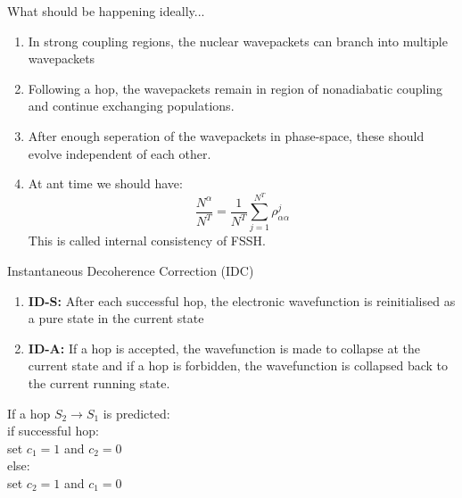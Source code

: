 \documentclass{beamer}
\begin{document}
	\begin{frame}[t]{What should be happening ideally...}
	\begin{enumerate}
	\item{In strong coupling regions, the nuclear wavepackets can branch into multiple wavepackets}
	\item{Following a hop, the wavepackets remain in region of nonadiabatic coupling and continue exchanging populations.}
	\item{After enough seperation of the wavepackets in phase-space, these should evolve independent of each other.}
	\item{At ant time we should have:
	\begin{equation}\label{eq:15}
	\frac{N^\alpha}{N^T} = \frac{1}{N^T}\sum_{j=1}^{N^T} \rho_{\alpha\alpha}^j
	\end{equation}
	This is called internal consistency of FSSH.}
	\end{enumerate}
	\end{frame}
	

	
	\begin{frame}[t]{Instantaneous Decoherence Correction (IDC)}
	\begin{enumerate}
	\item{\textbf{ID-S:} After each successful hop, the electronic wavefunction is reinitialised as a pure state in the current state}
	\item{\textbf{ID-A:} If a hop is accepted, the wavefunction is made to collapse at the current state and if a hop is forbidden, the wavefunction is collapsed back to the current running state.}
	\end{enumerate}
	If a hop $S_2 \rightarrow S_1$ is predicted:\\
	\hspace{2cm} if successful hop:\\
	\hspace{4cm} set $c_1 = 1$ and $c_2 = 0$\\
	\hspace{2cm} else:\\
	\hspace{4cm} set $c_2 = 1$ and $c_1 = 0$\\
	\end{frame}
	
\end{document}
